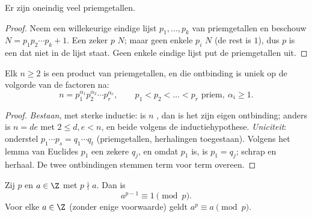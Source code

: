 \begin{theorem}[Euclides]\label{thm:g12:arith:infiniteprimes}
Er zijn oneindig veel priemgetallen.
\end{theorem}

\begin{proof}
Neem een willekeurige eindige lijst $p_1, \dots, p_k$ van priemgetallen en
beschouw $N = p_1 p_2 \cdots p_k + 1$. Een zeker  $p$  $N$;
maar geen enkele $p_i$  $N$ (de rest is $1$), dus $p$ is een 
dat niet in de lijst staat. Geen enkele eindige lijst put de priemgetallen
uit.
\end{proof}

\begin{theorem}\label{thm:g12:arith:fta}
Elk  $n \geq 2$ is een product van priemgetallen, en die
ontbinding is uniek op de volgorde van de factoren na:
\[
n = p_1^{\alpha_1} p_2^{\alpha_2} \cdots p_r^{\alpha_r},
\qquad p_1 < p_2 < \dots < p_r \text{ priem},\ \alpha_i \geq 1 .
\]
\end{theorem}

\begin{proof}
\emph{Bestaan}, met sterke inductie: is $n$ , dan is het zijn eigen
ontbinding; anders is $n = de$ met $2 \leq d, e < n$, en beide 
volgens de inductiehypothese. \emph{Uniciteit}: onderstel
$p_1\cdots p_s = q_1 \cdots q_t$ (priemgetallen, herhalingen toegestaan).
Volgens het lemma van Euclides  $p_1$ een zekere $q_j$, en omdat $p_1$
 is, is $p_1 = q_j$; schrap en herhaal. De twee ontbindingen stemmen term
voor term overeen.
\end{proof}

\begin{theorem}\label{thm:g12:arith:fermat}
Zij $p$  en $a \in \Z$ met $p \nmid a$. Dan is
\[
a^{p-1} \equiv 1 \pmod p .
\]
Voor elke $a \in \Z$ (zonder enige voorwaarde) geldt $a^p \equiv a \pmod p$.
\end{theorem}


